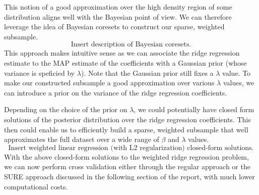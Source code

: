 This notion of a good approximation over the high density region of some distribution aligns well with the Bayesian point of view. We can therefore leverage the idea of Bayesian coresets to construct our sparse, weighted subsample.
\[
\text{Insert description of Bayesian coresets.}
\]
This approach makes intuitive sense as we can associate the ridge regression estimate to the MAP estimate of the coefficients with a Gaussian prior (whose variance is speficied by $\lambda$). Note that the Gaussian prior still fixes a $\lambda$ value. To make our constructed subsample a good approximation over various $\lambda$ values, we can introduce a prior on the variance of the ridge regression coefficients. 

Depending on the choice of the prior on $\lambda$, we could potentially have closed form solutions of the posterior distribution over the ridge regression coefficients. This then could enable us to efficiently build a sparse, weighted subsample that well approximates the full dataset over a wide range of $\beta$ and $\lambda$ values.
\[
\text{Insert weighted linear regression (with L2 regularization) closed-form solutions.}
\]
With the above closed-form solutions to the weighted ridge regression problem, we can now perform cross validation either through the regular approach or the SURE approach discussed in the following section of the report, with much lower computational costs.

